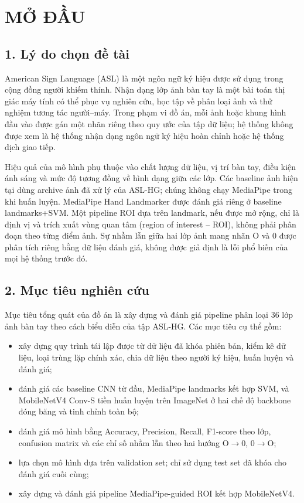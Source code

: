 \chapter*{MỞ ĐẦU}

\section*{1. Lý do chọn đề tài}
American Sign Language (ASL) là một ngôn ngữ ký hiệu được sử dụng trong cộng đồng người khiếm thính. Nhận dạng lớp ảnh bàn tay là một bài toán thị giác máy tính có thể phục vụ nghiên cứu, học tập về phân loại ảnh và thử nghiệm tương tác người--máy. Trong phạm vi đồ án, mỗi ảnh hoặc khung hình đầu vào được gán một nhãn riêng theo quy ước của tập dữ liệu; hệ thống không được xem là hệ thống nhận dạng ngôn ngữ ký hiệu hoàn chỉnh hoặc hệ thống dịch giao tiếp.

Hiệu quả của mô hình phụ thuộc vào chất lượng dữ liệu, vị trí bàn tay, điều kiện ánh sáng và mức độ tương đồng về hình dạng giữa các lớp. Các baseline ảnh hiện tại dùng archive ảnh đã xử lý của ASL-HG; chúng không chạy MediaPipe trong khi huấn luyện. MediaPipe Hand Landmarker được đánh giá riêng ở baseline landmarks+SVM. Một pipeline ROI dựa trên landmark, nếu được mở rộng, chỉ là định vị và trích xuất vùng quan tâm (region of interest -- ROI), không phải phân đoạn theo từng điểm ảnh. Sự nhầm lẫn giữa hai lớp ảnh mang nhãn O và 0 được phân tích riêng bằng dữ liệu đánh giá, không được giả định là lỗi phổ biến của mọi hệ thống trước đó.

\section*{2. Mục tiêu nghiên cứu}
Mục tiêu tổng quát của đồ án là xây dựng và đánh giá pipeline phân loại 36 lớp ảnh bàn tay theo cách biểu diễn của tập ASL-HG. Các mục tiêu cụ thể gồm:
\begin{itemize}
    \item xây dựng quy trình tái lập được từ dữ liệu đã khóa phiên bản, kiểm kê dữ liệu, loại trùng lặp chính xác, chia dữ liệu theo người ký hiệu, huấn luyện và đánh giá;
    \item đánh giá các baseline CNN từ đầu, MediaPipe landmarks kết hợp SVM, và MobileNetV4 Conv-S tiền huấn luyện trên ImageNet ở hai chế độ backbone đóng băng và tinh chỉnh toàn bộ;
    \item đánh giá mô hình bằng Accuracy, Precision, Recall, F1-score theo lớp, confusion matrix và các chỉ số nhầm lẫn theo hai hướng O$\rightarrow$0, 0$\rightarrow$O;
    \item lựa chọn mô hình dựa trên validation set; chỉ sử dụng test set đã khóa cho đánh giá cuối cùng;
    \item xây dựng và đánh giá pipeline MediaPipe-guided ROI kết hợp MobileNetV4.
\end{itemize}

